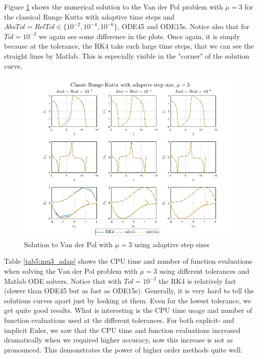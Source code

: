 Figure \ref{fig5:adap_mu3} shows the numerical solution to the Van der Pol problem with $\mu = 3$ for the classical Runge Kutta with adaptive time steps and $AbsTol=RelTol \in \{10^{-2}, 10^{-4}, 10^{-6}\}$, ODE45 and ODE15s. Notice also that for $Tol = 10^{-2}$ we again see some difference in the plots. Once again, it is simply because at the tolerance, the RK4 take such large time steps, that we can see the straight lines by Matlab. This is especially visible in the "corner" of the solution curve.

\begin{figure}[H]
    \centering
    \includegraphics[width=\textwidth]{graphics/opg5/mu3_adap.png}
    \caption{Solution to Van der Pol with $\mu = 3$ using adaptive step sizes}
    \label{fig5:adap_mu3}
\end{figure}

Table \ref{tab5:mu3_adap} shows the CPU time and number of function evaluations when solving the Van der Pol problem with $\mu = 3$ using different tolerances and Matlab ODE solvers. Notice that with $Tol = 10^{-2}$ the RK4 is relatively fast (slower than ODE45 but as fast as ODE15s). Generally, it is very hard to tell the solutions curves apart just by looking at them. Even for the lowest tolerance, we get quite good results. What is interesting is the CPU time usage and number of function evaluations used at the different tolerances. For both explicit- and implicit Euler, we saw that the CPU time and function evaluations increased dramatically when we required higher accuracy, now this increase is not as pronounced. This demonstrates the power of higher order methods quite well.

